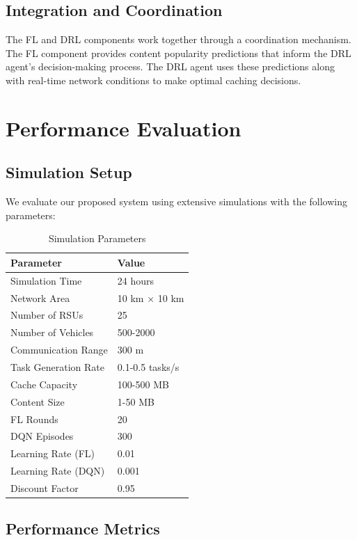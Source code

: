 \documentclass[conference]{IEEEtran}
\begin{document}
\subsection{Integration and Coordination}

The FL and DRL components work together through a coordination mechanism. The FL component provides content popularity predictions that inform the DRL agent's decision-making process. The DRL agent uses these predictions along with real-time network conditions to make optimal caching decisions.

\section{Performance Evaluation}

\subsection{Simulation Setup}

We evaluate our proposed system using extensive simulations with the following parameters:

\begin{table}[h]
\centering
\caption{Simulation Parameters}
\label{tab:sim_params}
\begin{tabular}{|l|l|}
\hline
\textbf{Parameter} & \textbf{Value} \\
\hline
Simulation Time & 24 hours \\
Network Area & 10 km × 10 km \\
Number of RSUs & 25 \\
Number of Vehicles & 500-2000 \\
Communication Range & 300 m \\
Task Generation Rate & 0.1-0.5 tasks/s \\
Cache Capacity & 100-500 MB \\
Content Size & 1-50 MB \\
FL Rounds & 20 \\
DQN Episodes & 300 \\
Learning Rate (FL) & 0.01 \\
Learning Rate (DQN) & 0.001 \\
Discount Factor & 0.95 \\
\hline
\end{tabular}
\end{table}

\subsection{Performance Metrics}
\end{document}
